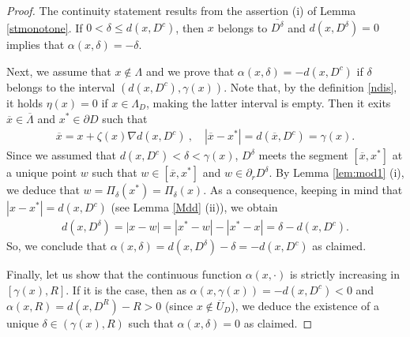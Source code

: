 \documentclass[reqno,11pt]{amsart}
\theoremstyle{definition}
\numberwithin{equation}{section}
\def\ov{\overline}
\newcommand{\1}{{{\bf 1}\kern-0,28em\rm l}}
\def\proj{\Pi}
\begin{document}
\begin{proof}
The continuity statement results from the assertion (i) of Lemma \ref{stmonotone}.
 If $0<\delta \le d(x,D^c)$, then $x$ belongs to $\ov{D^\delta}$ and  $d(x,D^\delta)= 0$ implies that  $\alpha(x,\delta)=-\delta$.

\medskip
Next, we assume that  $x\notin \Lambda$ and  we prove that $\alpha(x,\delta) = -d(x,D^c)$ if $\delta$ belongs to the interval $(d(x,D^c),\gamma(x))$. 
Note that, by the definition  \eqref{ndis}, it holds  $\eta(x)=0$ if $x\in \Lambda_D$, making the latter interval is empty. Then it exits $\ov x\in \ov\Lambda$ 
and $x^*\in \partial D$ such that
\begin{align*}
\ov x= x +\zeta(x) \nabla d(x,D^c)\ ,\quad |\ov x - x^*| = d(\ov x,D^c)= \gamma(x) .
\end{align*}
Since we assumed that  $d(x,D^c)< \delta <\gamma(x)$, $D^\delta$ meets the segment $[\ov x, x^*]$ at a unique point $w$ such that  $w\in [\ov x,x^*]$ and $w \in \partial_r D^\delta$. By Lemma \ref{lem:mod1} (i), we deduce that $w = \proj_\delta (x^*)= \proj_\delta (x)$.
As a consequence, keeping in mind that $|x-x^*| = d(x,D^c)$ (see Lemma \ref{Mdd} (ii)), we obtain
\begin{align*}
d(x, D^\delta) = |x- w|  =  |x^*-w| - |x^*-x| = \delta - d(x,D^c).
\end{align*}
So, we conclude that $\alpha(x,\delta) = d(x,D^\delta) -\delta = -d(x,D^c)$ as claimed. 

\medskip
Finally, let us show that  the continuous function $\alpha(x,\cdot)$ is strictly increasing in $[\gamma(x), R]$. If it is the case, then as  $\alpha(x,\gamma(x))= -d(x,D^c) < 0$
and $\alpha(x,R)= d(x,D^R) - R > 0$ (since $x\notin \ov U_D$), we deduce 
 the existence of a unique $\delta\in (\gamma(x), R)$ such that $\alpha(x,\delta) =0$ as claimed.


\end{proof}
\end{document}
